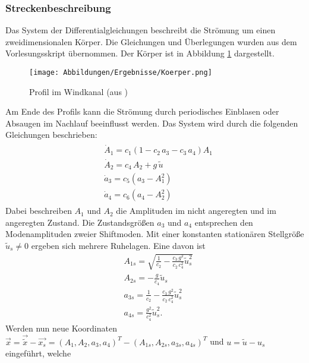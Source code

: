             \subsubsection{Streckenbeschreibung}
                Das System der Differentialgleichungen beschreibt die Strömung um einen zweidimensionalen Körper. Die Gleichungen und Überlegungen wurden aus dem 
                Vorlesungsskript \cite{kingNL} übernommen. Der Körper ist in Abbildung \ref{Abb:Koerper} dargestellt.
                \begin{figure}[h]
                    \texttt{[image: Abbildungen/Ergebnisse/Koerper.png]}
                    \centering
                    \caption{Profil im Windkanal (aus \cite{kingNL})}
                    \label{Abb:Koerper}    
                \end{figure}
                Am Ende des Profils kann die Strömung durch periodisches Einblasen oder Absaugen im Nachlauf beeinflusst werden. Das System wird durch die folgenden 
                Gleichungen beschrieben:
                \begin{align}
                    \begin{split}
                    &\dot{A}_1 = c_1(1-c_2\,a_3 - c_3\,a_4)A_1\\
                    &\dot{A}_2 = c_4\,A_2+g\,\tilde{u} \\
                    &\dot{a}_3 = c_5(a_3 - A_1^2) \\
                    &\dot{a}_4 = c_6(a_4 - A_2^2)
                    \end{split}
                \end{align}
                Dabei beschreiben $A_1$ und $A_2$ die Amplituden im nicht angeregten und im angeregten Zustand. Die Zustandsgrößen $a_3$ und $a_4$ entsprechen den Modenamplituden zweier
                Shiftmoden. Mit einer konstanten stationären Stellgröße $\tilde{u}_s \neq 0$ ergeben sich mehrere Ruhelagen. Eine davon ist 
                \begin{align}
                    &A_{1s} = \sqrt{\frac{1}{c_2}-\frac{c_3\,g^2}{c_2\,c_4^2}\tilde{u}_s^2}\\
                    &A_{2s} = - \frac{g}{c_4}\tilde{u}_s\\
                    &a_{3s} = \frac{1}{c_2}-\frac{c_3\,g^2}{c_2\,c_4^2}\tilde{u}_s^2\\
                    &a_{4s} = \frac{g^2}{c_4^2}\tilde{u}^2_s.
                \end{align}
                Werden nun neue Koordinaten $\vec{x} = \vec{\tilde{x}}-\vec{x_s} = (A_1,A_2,a_3,a_4)^T - (A_{1s},A_{2s},a_{3s},a_{4s})^T$ und $u = \tilde{u} - u_s$ eingeführt, welche 
